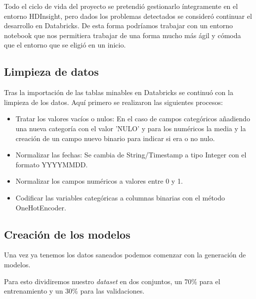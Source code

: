 Todo el ciclo de vida del proyecto se pretendió gestionarlo íntegramente en el entorno HDInsight, pero dados los problemas detectados se consideró continuar el desarrollo en Databricks. De esta forma podríamos trabajar con un entorno notebook que nos permitiera trabajar de una forma mucho más ágil y cómoda que el entorno que se eligió en un inicio.

\subsection{Limpieza de datos}
Tras la importación de las tablas minables en Databricks se continuó con la limpieza de los datos.
Aquí primero se realizaron las siguientes procesos:
\begin{itemize}
    \item Tratar los valores vacíos o nulos:
    En el caso de campos categóricos añadiendo una nueva categoría con el valor 'NULO' y para los numéricos la media y la creación de un campo nuevo binario para indicar si era o no nulo.
    \item Normalizar las fechas:
    Se cambia de String/Timestamp a tipo Integer con el formato YYYYMMDD.
    \item Normalizar los campos numéricos a valores entre 0 y 1.
    \item Codificar las variables categóricas a columnas binarias con el método OneHotEncoder.
\end{itemize}

\subsection{Creación de los modelos}
Una vez ya tenemos los datos saneados podemos comenzar con la generación de modelos.

Para esto dividiremos nuestro \textit{dataset} en dos conjuntos, un 70\% para el entrenamiento y un 30\% para las validaciones.

